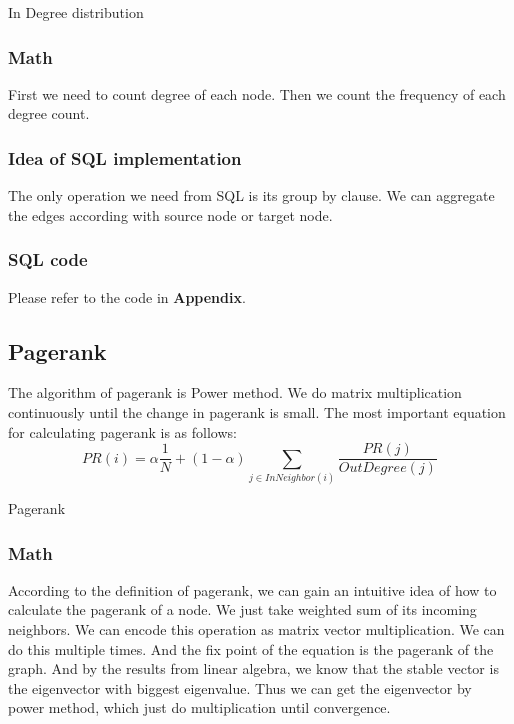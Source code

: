 \begin{algorithm}[!htbf]
\caption{In Degree distribution}
\begin{algorithmic}
\end{algorithmic}
\label{algo1:2}
\end{algorithm}

\subsubsection{Math}
First we need to count degree of each node. Then we count the frequency of each degree count. 

\subsubsection{Idea of SQL implementation}
The only operation we need from SQL is its group by clause. We can aggregate the edges according with source node or target node.

\subsubsection{SQL code}
Please refer to the code in {\bf Appendix}.

\subsection{Pagerank}
The algorithm of pagerank is Power method. We do matrix multiplication continuously until the change in pagerank is small. The most important equation for calculating pagerank is as follows:
\begin{equation}
  PR(i) = \alpha \frac{1}{N} + (1 - \alpha) \sum_{j \in InNeighbor(i)} \frac{PR(j)}{OutDegree(j)}
\end{equation}
\begin{algorithm}
\caption{Pagerank}
\begin{algorithmic}
\REPEAT
{}
\end{algorithmic}
\end{algorithm}

\subsubsection{Math}
According to the definition of pagerank, we can gain an intuitive idea of how to calculate the pagerank of a node.
We just take weighted sum of its incoming neighbors. We can encode this operation as matrix vector multiplication.
We can do this multiple times. And the fix point of the equation is the pagerank of the graph. And by the results 
from linear algebra, we know that the stable vector is the eigenvector with biggest eigenvalue. Thus we can get 
the eigenvector by power method, which just do multiplication until convergence. 

